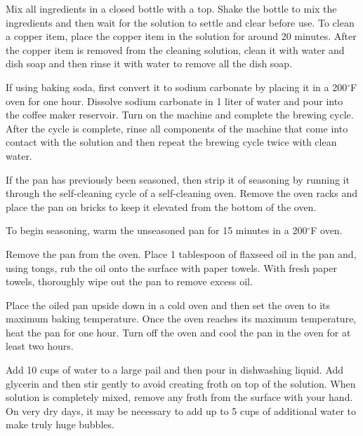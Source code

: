 \documentclass[letterpaper]{recipePMG}
\renewcommand{\deg}{$^\circ$}
\begin{document}
Mix all ingredients in a closed bottle with a top. Shake the bottle to mix the ingredients and then wait for the solution to settle and clear before use. To clean a copper item, place the copper item in the solution for around 20 minutes.  After the copper item is removed from the cleaning solution, clean it with water and dish soap and then rinse it with water to remove all the dish soap.



If using baking soda, first convert it to sodium carbonate by placing it in a 200\deg F oven for one hour.  Dissolve sodium carbonate in 1 liter of water and pour into the coffee maker reservoir. Turn on the machine and complete the brewing cycle.  After the cycle is complete, rinse all components of the machine that come into contact with the solution and then repeat the brewing cycle twice with clean water.

\newpage



If the pan has previously been seasoned, then strip it of seasoning by running it through the self-cleaning cycle of a self-cleaning oven. Remove the oven racks and place the pan on bricks to keep it elevated from the bottom of the oven. 

To begin seasoning, warm the unseasoned pan for 15 minutes in a 200\deg F oven. 

Remove the pan from the oven.  Place 1 tablespoon of flaxseed oil in the pan and, using tongs, rub the oil onto the surface with paper towels. With fresh paper towels, thoroughly wipe out the pan to remove excess oil. 

Place the oiled pan upside down in a cold oven and then set the oven to its maximum baking temperature. Once the oven reaches its maximum temperature, heat the pan for one hour.  Turn off the oven and cool the pan in the oven for at least two hours.



Add 10 cups of water to a large pail and then pour in dishwashing liquid.  Add glycerin and then stir gently to avoid creating froth on top of the solution.  When solution is completely mixed, remove any froth from the surface with your hand. On very dry days, it may be necessary to add up to 5 cups of additional water to make truly huge bubbles.
\end{document}
